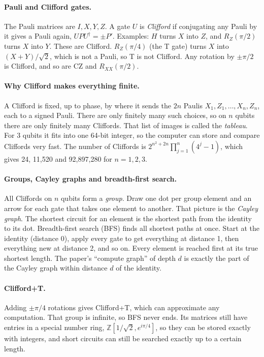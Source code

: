 \documentclass[11pt,a4paper]{article}
\begin{document}
\paragraph{Pauli and Clifford gates.} The Pauli matrices are $I,X,Y,Z$. A gate $U$ is \emph{Clifford} if conjugating any
Pauli by it gives a Pauli again, $UPU^\dagger=\pm P'$. Examples: $H$ turns $X$ into $Z$, and $R_Z(\pi/2)$ turns $X$ into
$Y$. These are Clifford. $R_Z(\pi/4)$ (the T gate) turns $X$ into $(X+Y)/\sqrt2$, which is not a Pauli, so T is not
Clifford. Any rotation by $\pm\pi/2$ is Clifford, and so are CZ and $R_{XX}(\pi/2)$.

\paragraph{Why Clifford makes everything finite.} A Clifford is fixed, up to phase, by where it sends the $2n$ Paulis
$X_1,Z_1,\dots,X_n,Z_n$, each to a signed Pauli. There are only finitely many such choices, so on $n$ qubits there are only
finitely many Cliffords. That list of images is called the \emph{tableau}. For 3 qubits it fits into one 64-bit integer,
so the computer can store and compare Cliffords very fast. The number of Cliffords is
$2^{n^2+2n}\prod_{j=1}^n(4^j-1)$, which gives 24, 11,520 and 92,897,280 for $n=1,2,3$.

\paragraph{Groups, Cayley graphs and breadth-first search.} All Cliffords on $n$ qubits form a \emph{group}. Draw one dot
per group element and an arrow for each gate that takes one element to another. That picture is the \emph{Cayley graph}.
The shortest circuit for an element is the shortest path from the identity to its dot. Breadth-first search (BFS) finds
all shortest paths at once. Start at the identity (distance 0), apply every gate to get everything at distance 1, then
everything new at distance 2, and so on. Every element is reached first at its true shortest length. The paper's
``compute graph'' of depth $d$ is exactly the part of the Cayley graph within distance $d$ of the identity.

\paragraph{Clifford+T.} Adding $\pm\pi/4$ rotations gives Clifford+T, which can approximate any computation. That group is
infinite, so BFS never ends. Its matrices still have entries in a special number ring, $\mathbb Z[1/\sqrt2,e^{i\pi/4}]$,
so they can be stored exactly with integers, and short circuits can still be searched exactly up to a certain length.
\end{document}
